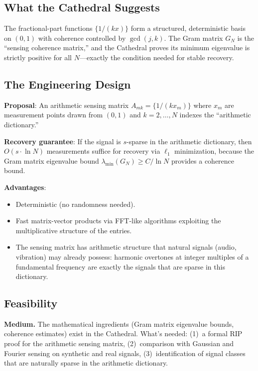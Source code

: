 \documentclass[11pt,a4paper]{article}
\begin{document}
\subsection{What the Cathedral Suggests}

The fractional-part functions $\{1/(kx)\}$ form a structured,
deterministic basis on $(0,1)$ with coherence controlled by
$\gcd(j,k)$. The Gram matrix $G_N$ is the ``sensing coherence
matrix,'' and the Cathedral proves its minimum eigenvalue is
strictly positive for all $N$---exactly the condition needed for
stable recovery.

\subsection{The Engineering Design}

\textbf{Proposal}: An arithmetic sensing matrix
$A_{mk} = \{1/(k x_m)\}$ where $x_m$ are measurement points drawn
from $(0,1)$ and $k = 2, \ldots, N$ indexes the ``arithmetic
dictionary.''

\textbf{Recovery guarantee}: If the signal is $s$-sparse in the
arithmetic dictionary, then $O(s \cdot \ln N)$ measurements suffice
for recovery via $\ell_1$ minimization, because the Gram matrix
eigenvalue bound $\lambda_{\min}(G_N) \geq C / \ln N$ provides a
coherence bound.

\textbf{Advantages}:
\begin{itemize}
  \item Deterministic (no randomness needed).
  \item Fast matrix-vector products via FFT-like algorithms
    exploiting the multiplicative structure of the entries.
  \item The sensing matrix has arithmetic structure that natural
    signals (audio, vibration) may already possess: harmonic
    overtones at integer multiples of a fundamental frequency are
    exactly the signals that are sparse in this dictionary.
\end{itemize}

\subsection{Feasibility}

\textbf{Medium.} The mathematical ingredients (Gram matrix
eigenvalue bounds, coherence estimates) exist in the Cathedral.
What's needed: (1)~a formal RIP proof for the arithmetic sensing
matrix, (2)~comparison with Gaussian and Fourier sensing on
synthetic and real signals, (3)~identification of signal classes
that are naturally sparse in the arithmetic dictionary.
\end{document}
